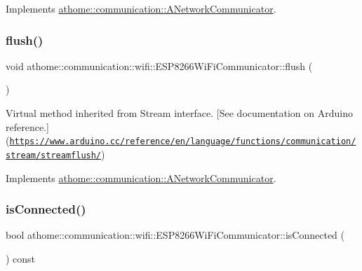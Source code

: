 Implements \mbox{\hyperlink{classathome_1_1communication_1_1_a_network_communicator_a025b7fbe9b3c4452fcf1925d766324eb}{athome\+::communication\+::\+A\+Network\+Communicator}}.

\mbox{\label{classathome_1_1communication_1_1wifi_1_1_e_s_p8266_wi_fi_communicator_af95ca7f47285b13fc895e0d9323ee320}} 
\subsubsection{\texorpdfstring{flush()}{flush()}}
{\footnotesize\ttfamily void athome\+::communication\+::wifi\+::\+E\+S\+P8266\+Wi\+Fi\+Communicator\+::flush (\begin{DoxyParamCaption}{ }\end{DoxyParamCaption})\hspace{0.3cm}{\ttfamily [virtual]}}

Virtual method inherited from Stream interface. \mbox{[}See documentation on Arduino reference.\mbox{]}(\href{https://www.arduino.cc/reference/en/language/functions/communication/stream/streamflush/}{\tt https\+://www.\+arduino.\+cc/reference/en/language/functions/communication/stream/streamflush/}) 

Implements \mbox{\hyperlink{classathome_1_1communication_1_1_a_network_communicator_a5e3b278ad11e6c00ac7d3e2fee3f01b1}{athome\+::communication\+::\+A\+Network\+Communicator}}.

\mbox{\label{classathome_1_1communication_1_1wifi_1_1_e_s_p8266_wi_fi_communicator_aefadac9b1a67d52853495dfabecad5fd}} 
\subsubsection{\texorpdfstring{is\+Connected()}{isConnected()}}
{\footnotesize\ttfamily bool athome\+::communication\+::wifi\+::\+E\+S\+P8266\+Wi\+Fi\+Communicator\+::is\+Connected (\begin{DoxyParamCaption}{ }\end{DoxyParamCaption}) const\hspace{0.3cm}{\ttfamily [virtual]}}

